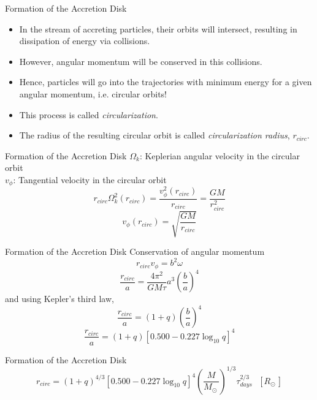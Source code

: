 \documentclass{beamer}
\begin{document}
\begin{darkframes}
\begin{frame}{Formation of the Accretion Disk}
	\begin{itemize}
	\item In the stream of accreting particles, their orbits will intersect, resulting in dissipation of energy via collisions.
	\pause
	\item However, angular momentum will be conserved in this collisions.
	\pause
	\item Hence, particles will go into the trajectories with minimum energy for a given angular momentum,
	\pause
	i.e. circular orbits!
	\pause
	\item This process is called \textit{circularization}.
	\pause
	\item The radius of the resulting circular orbit is called \textit{circularization radius}, $r_{circ}$.
	\end{itemize}
\end{frame}

\begin{frame}{Formation of the Accretion Disk}
	$\Omega_k$: Keplerian angular velocity in the circular orbit\\
	\pause
	$ v_\phi$: Tangential velocity in the circular orbit
	\pause
	\[ r_{circ} \Omega_k^2 \left( r_{circ} \right) = \frac{v_\phi^2 \left( r_{circ} \right)}{r_{circ}} = \frac{GM}{r_{circ}^2} \]
	\pause
	\[v_\phi \left( r_{circ} \right) = \sqrt{\frac{GM}{r_{circ}}}\]
\end{frame}

\begin{frame}{Formation of the Accretion Disk}
	Conservation of angular momentum
	\pause
	\[ r_{circ} v_\phi = b^2 \omega\]
	\pause
	\[ \frac{r_{circ}}{a} = \frac{4 \pi^2}{GM\tau} a^3 \left( \frac{b}{a} \right)^4 \]
	\pause
	and using Kepler's third law,
	\[\frac{r_{circ}}{a} = (1+q) \left( \frac{b}{a} \right)^4 \]
	\pause
	\[\frac{r_{circ}}{a} = (1+q)  \left[0.500 - 0.227 \log_{10} q \right]^4 \]
\end{frame}

\begin{frame}{Formation of the Accretion Disk}
	\[r_{circ} = (1+q)^{4/3}  \left[0.500 - 0.227 \log_{10} q \right]^4 \left( \frac{M}{M_{\odot\ }} \right)^{1/3} \tau_{days}^{2/3} \textrm{ } \left[ R_{\odot\ } \right] \]
\end{frame}


\end{darkframes}
\end{document}
